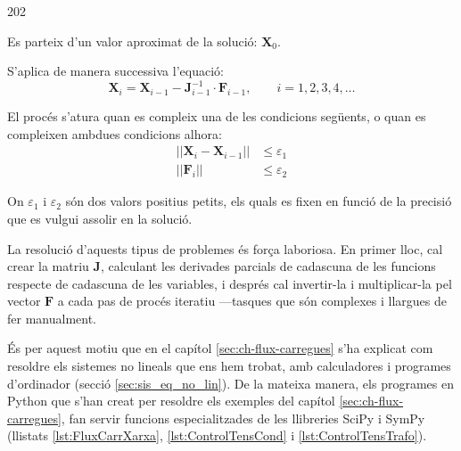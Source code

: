 \begin{dingautolist}{202}
	\item Es parteix d'un valor aproximat de la solució: $\boldsymbol{X}_0$.
	
	\item   S'aplica de manera successiva l'equació:
	\begin{equation}
		\boldsymbol{X}_i = \boldsymbol{X}_{i-1} - \boldsymbol{J}_{i-1}^{-1} \cdot \boldsymbol{F}_{i-1}, \qquad i=1,2,3,4, \dots
	\end{equation}
	
	\item   El procés s'atura quan es compleix una de les condicions següents, o quan es compleixen ambdues condicions alhora:
	\begin{subequations}\begin{align}
			||\boldsymbol{X}_i - \boldsymbol{X}_{i-1}|| &\leq \varepsilon_1 \\
			||\boldsymbol{F}_i|| &\leq \varepsilon_2
	\end{align}\end{subequations}
	
	On $\varepsilon_1$ i $\varepsilon_2$ són dos valors positius petits, els quals es fixen en funció de la precisió que es vulgui assolir en la solució.
\end{dingautolist}

La resolució d'aquests tipus de problemes és força laboriosa. En primer lloc, cal crear la matriu  $\boldsymbol{J}$, calculant les derivades parcials de cadascuna de les funcions respecte de cadascuna de les variables, i després  cal invertir-la i multiplicar-la pel vector $\boldsymbol{F}$ a cada pas de procés iteratiu ---tasques que són  complexes i llargues  de fer manualment.

És per aquest motiu que en el capítol \ref{sec:ch-flux-carregues}  s'ha explicat com resoldre els sistemes no lineals que ens hem trobat, amb calculadores i programes d'ordinador (secció \ref{sec:sis_eq_no_lin}). De la mateixa manera, els programes en Python que s'han creat  per resoldre els exemples del capítol \ref{sec:ch-flux-carregues},  fan servir funcions especialitzades de les llibreries SciPy i SymPy (llistats \ref{lst:FluxCarrXarxa}, \ref{lst:ControlTensCond} i \ref{lst:ControlTensTrafo}). 
